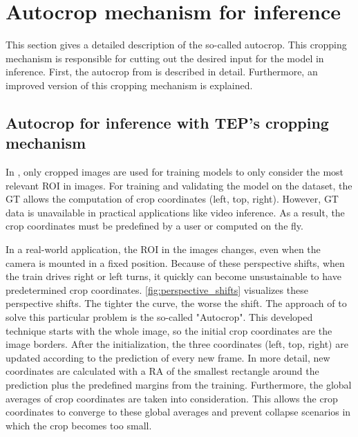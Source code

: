 \section{Autocrop mechanism for inference}
\label{sec:autocrop}

This section gives a detailed description of the so-called autocrop.
This cropping mechanism is responsible for cutting out the desired input for the model in inference.
First, the autocrop from \cite{tepNet2024} is described in detail.
Furthermore, an improved version of this cropping mechanism is explained.

\subsection{Autocrop for inference with TEP's cropping mechanism}

In \cite{tepNet2024}, only cropped images are used for training models to only consider the most relevant \ac{ROI} in images.
For training and validating the model on the dataset, the \ac{GT} allows the computation of crop coordinates (left, top, right).
However, \ac{GT} data is unavailable in practical applications like video inference.
As a result, the crop coordinates must be predefined by a user or computed on the fly.

In a real-world application, the \ac{ROI} in the images changes, even when the camera is mounted in a fixed position.
Because of these perspective shifts, when the train drives right or left turns, it quickly can become unsustainable to have predetermined crop coordinates.
\autoref{fig:perspective_shifts} visualizes these perspective shifts.
The tighter the curve, the worse the shift.
The approach of \cite{tepNet2024} to solve this particular problem is the so-called "Autocrop".
This developed technique starts with the whole image, so the initial crop coordinates are the image borders.
After the initialization, the three coordinates (left, top, right) are updated according to the prediction of every new frame.
In more detail, new coordinates are calculated with a \ac{RA} of the smallest rectangle around the prediction plus the predefined margins from the training.
Furthermore, the global averages of crop coordinates are taken into consideration.
This allows the crop coordinates to converge to these global averages and prevent collapse scenarios in which the crop becomes too small.


